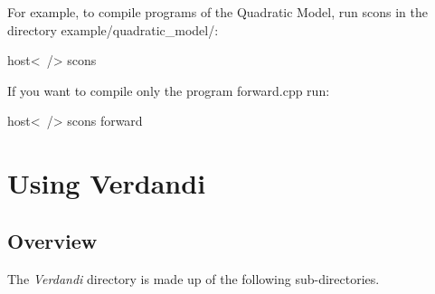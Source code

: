 \documentclass{tufte-book}
\begin{document}
\begin{itemize}
\-For example, to compile programs of the Quadratic Model, run {\ttfamily scons} in the directory {\ttfamily example/quadratic\-\_\-model/}\-:


\begin{frame_bash}
host<~/> scons
\end{frame_bash}

If you want to compile only the program {\ttfamily forward.cpp} run:

\begin{frame_bash}
host<~/> scons forward
\end{frame_bash}




\end{itemize}

\chapter{Using Verdandi}



\hypertarget{overview}{}\section{Overview}\label{overview}

The \-\emph{Verdandi} directory is made up of the following sub-directories.
\end{document}
